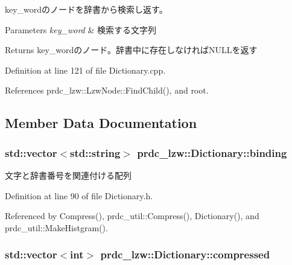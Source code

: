 key\-\_\-wordのノードを辞書から検索し返す。 


\begin{DoxyParams}{Parameters}
{\em key\-\_\-word} & 検索する文字列 \\
\hline
\end{DoxyParams}
\begin{DoxyReturn}{Returns}
key\-\_\-wordのノード。辞書中に存在しなければ\-N\-U\-L\-Lを返す 
\end{DoxyReturn}


Definition at line 121 of file Dictionary.\-cpp.



References prdc\-\_\-lzw\-::\-Lzw\-Node\-::\-Find\-Child(), and root.



\subsection{Member Data Documentation}
\hypertarget{classprdc__lzw_1_1Dictionary_af5c7156370b9ee5d0e060624d409bce1}{
\subsubsection[{binding}]{\setlength{\rightskip}{0pt plus 5cm}std\-::vector$<$std\-::string$>$ prdc\-\_\-lzw\-::\-Dictionary\-::binding}}\label{classprdc__lzw_1_1Dictionary_af5c7156370b9ee5d0e060624d409bce1}


文字と辞書番号を関連付ける配列 



Definition at line 90 of file Dictionary.\-h.



Referenced by Compress(), prdc\-\_\-util\-::\-Compress(), Dictionary(), and prdc\-\_\-util\-::\-Make\-Histgram().

\hypertarget{classprdc__lzw_1_1Dictionary_a18e15168c7acd82f062141627e5a8b75}{
\subsubsection[{compressed}]{\setlength{\rightskip}{0pt plus 5cm}std\-::vector$<$int$>$ prdc\-\_\-lzw\-::\-Dictionary\-::compressed}}\label{classprdc__lzw_1_1Dictionary_a18e15168c7acd82f062141627e5a8b75}


